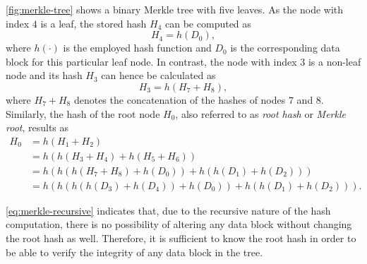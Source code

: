 		\autoref{fig:merkle-tree} shows a binary Merkle tree with five leaves.
		As the node with index $4$ is a leaf, the stored hash $H_4$ can be computed as
		\begin{equation}
			H_4 = h(D_0),
		\end{equation}
		where $h(\cdot)$ is the employed hash function and $D_0$ is the corresponding data block for this particular leaf node.
		In contrast, the node with index $3$ is a non-leaf node and its hash $H_3$ can hence be calculated as
		\begin{equation}
			H_3 = h(H_7 + H_8),
		\end{equation}
		where $H_7 + H_8$ denotes the concatenation of the hashes of nodes $7$ and $8$.
		Similarly, the hash of the root node $H_0$, also referred to as \emph{root hash} or \emph{Merkle root}, results as
		\begin{align}
			H_0 &= h(H_1 + H_2)\\
			&= h(h(H_3 + H_4) + h(H_5 + H_6))\\
			&= h(h(h(H_7 + H_8) + h(D_0)) + h(h(D_1) + h(D_2)))\\
			&= h(h(h(h(D_3) + h(D_4)) + h(D_0)) + h(h(D_1) + h(D_2))).\label{eq:merkle-recursive}
		\end{align}

		\autoref{eq:merkle-recursive} indicates that, due to the recursive nature of the hash computation, there is no possibility of altering any data block without changing the root hash as well.
		Therefore, it is sufficient to know the root hash in order to be able to verify the integrity of any data block in the tree.

